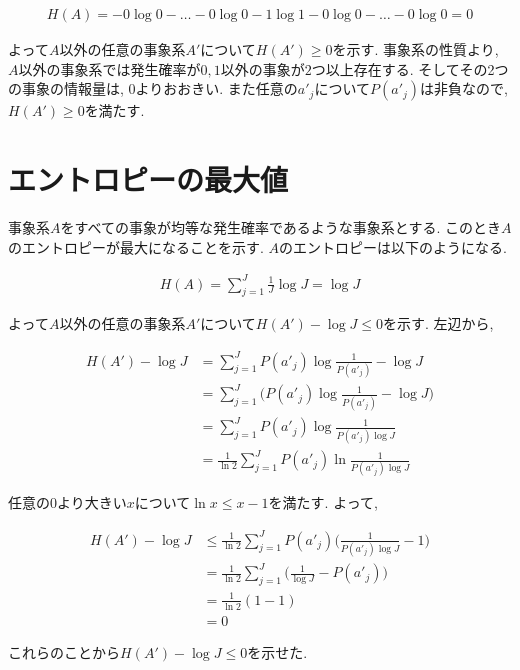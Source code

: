 \documentclass[dvipdfmx, 10pt]{jsarticle}
\begin{document}
\begin{align*}
    H(A) = -0 \log 0 - \dots -0 \log 0 - 1 \log 1 -0 \log 0 - \dots -0 \log 0 = 0
\end{align*}

よって\(A\)以外の任意の事象系\(A'\)について\(H(A') \geq 0\)を示す. 
事象系の性質より, \(A\)以外の事象系では発生確率が\(0, 1\)以外の事象が\(2\)つ以上存在する. 
そしてその2つの事象の情報量は, \(0\)よりおおきい. また任意の\(a'_j\)について\(P(a'_j)\)は非負なので, \(H(A') \geq 0\)を満たす. 

\section*{エントロピーの最大値}
事象系\(A\)をすべての事象が均等な発生確率であるような事象系とする. 
このとき\(A\)のエントロピーが最大になることを示す. \(A\)のエントロピーは以下のようになる. 

\begin{align*}
    H(A) = \sum_{j=1}^{J} \frac{1}{J} \log J = \log J
\end{align*}

よって\(A\)以外の任意の事象系\(A'\)について\(H(A') - \log J \leq 0 \)を示す. 左辺から, 

\begin{align*}
    H(A') - \log J 
    &= \sum_{j=1}^{J} P(a'_j) \log \frac{1}{P(a'_j)} - \log J \\
    &= \sum_{j=1}^{J}\Big ( P(a'_j) \log \frac{1}{P(a'_j)} - \log J \Big) \\
    &= \sum_{j=1}^{J} P(a'_j) \log \frac{1}{P(a'_j) \log J } \\
    &= \frac{1}{\ln2} \sum_{j=1}^{J} P(a'_j) \ln \frac{1}{P(a'_j) \log J }
\end{align*}

任意の\(0\)より大きい\(x\)について\(\ln x \leq x -1\)を満たす. よって, 

\begin{align*}
    H(A') - \log J 
    &\leq \frac{1}{\ln2} \sum_{j=1}^{J} P(a'_j) \Big( \frac{1}{P(a'_j) \log J } - 1 \Big) \\
    &= \frac{1}{\ln2} \sum_{j=1}^{J} \Big( \frac{1}{\log J} - P(a'_j) \Big) \\
    &= \frac{1}{\ln2} (1 - 1) \\
    &= 0
\end{align*}

これらのことから\(H(A') - \log J \leq 0 \)を示せた. 
\end{document}
